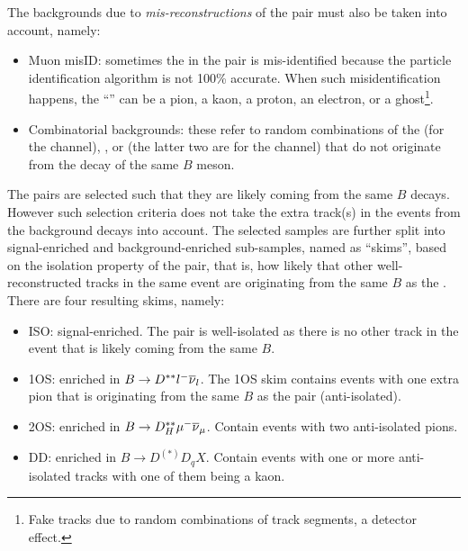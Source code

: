 The backgrounds due to \emph{mis-reconstructions} of the \DXmu pair must
also be taken into account, namely:
\begin{itemize}
    \item Muon misID:
        sometimes the \muon in the \DXmu pair is mis-identified
        because the particle identification algorithm is not 100\% accurate.
        When such misidentification happens,
        the ``\muon'' can be a pion, a kaon, a proton, an electron,
        or a ghost\footnote{
            Fake tracks due to random combinations of track segments, a detector
            effect.
        }.
    \item Combinatorial backgrounds:
        these refer to random combinations of the \Dz \muon
        (for the \Dz channel),
        \Dstar \muon, or \Dz \pion (the latter two are for the \Dstar channel)
        that do not originate from the decay of the same $B$ meson.
\end{itemize}


The \DXmu pairs are selected such that they are likely coming from
the same $B$ decays.
However such selection criteria does not take the extra track(s) in the events
from the background decays into account.
The selected \DXmu samples are further split into signal-enriched and
background-enriched sub-samples, named as ``skims'',
based on the isolation property of the \DXmu pair,
that is, how likely that other well-reconstructed tracks in the same event
are originating from the same $B$ as the \DXmu.
There are four resulting skims, namely:
\begin{itemize}
    \item ISO:
        signal-enriched. The \DXmu pair is well-isolated as there
        is no other track in the event that is likely coming from the same $B$.
    \item 1OS:
        enriched in $B \rightarrow D^{**} {l^-}{{\overline{\nu}}_l}$.
        The 1OS skim contains events with one extra pion that is originating
        from the same $B$ as the \DXmu pair
        (anti-isolated).
    \item 2OS:
        enriched in $B \rightarrow D^{**}_H {\mu^-}{{\overline{\nu}}_\mu}$.
        Contain events with two anti-isolated pions.
    \item DD:
        enriched in $B \rightarrow D^{(*)} D_q X$.
        Contain events with one or more anti-isolated tracks with one
        of them being a kaon.
\end{itemize}


